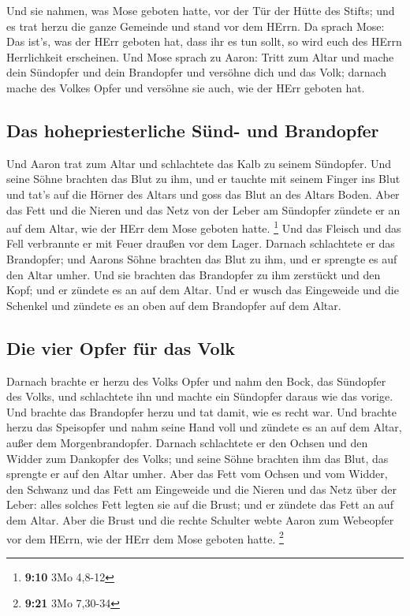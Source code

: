  Und sie nahmen, was Mose geboten hatte, vor der Tür der
Hütte des Stifts; und es trat herzu die ganze Gemeinde und stand vor dem
HErrn.  Da sprach Mose: Das ist's, was der HErr geboten
hat, dass ihr es tun sollt, so wird euch des HErrn Herrlichkeit
erscheinen.  Und Mose sprach zu Aaron: Tritt zum Altar und
mache dein Sündopfer und dein Brandopfer und versöhne dich und das Volk;
darnach mache des Volkes Opfer und versöhne sie auch, wie der HErr
geboten hat.

\hypertarget{das-hohepriesterliche-suxfcnd--und-brandopfer}{%
\subsection{Das hohepriesterliche Sünd- und
Brandopfer}\label{das-hohepriesterliche-suxfcnd--und-brandopfer}}

 Und Aaron trat zum Altar und schlachtete das Kalb zu
seinem Sündopfer.  Und seine Söhne brachten das Blut zu
ihm, und er tauchte mit seinem Finger ins Blut und tat's auf die Hörner
des Altars und goss das Blut an des Altars Boden.  Aber
das Fett und die Nieren und das Netz von der Leber am Sündopfer zündete
er an auf dem Altar, wie der HErr dem Mose geboten hatte. \footnote{\textbf{9:10}
  3Mo 4,8-12}  Und das Fleisch und das Fell verbrannte er
mit Feuer draußen vor dem Lager.  Darnach schlachtete er
das Brandopfer; und Aarons Söhne brachten das Blut zu ihm, und er
sprengte es auf den Altar umher.  Und sie brachten das
Brandopfer zu ihm zerstückt und den Kopf; und er zündete es an auf dem
Altar.  Und er wusch das Eingeweide und die Schenkel und
zündete es an oben auf dem Brandopfer auf dem Altar.

\hypertarget{die-vier-opfer-fuxfcr-das-volk}{%
\subsection{Die vier Opfer für das
Volk}\label{die-vier-opfer-fuxfcr-das-volk}}

 Darnach brachte er herzu des Volks Opfer und nahm den
Bock, das Sündopfer des Volks, und schlachtete ihn und machte ein
Sündopfer daraus wie das vorige.  Und brachte das
Brandopfer herzu und tat damit, wie es recht war.  Und
brachte herzu das Speisopfer und nahm seine Hand voll und zündete es an
auf dem Altar, außer dem Morgenbrandopfer.  Darnach
schlachtete er den Ochsen und den Widder zum Dankopfer des Volks; und
seine Söhne brachten ihm das Blut, das sprengte er auf den Altar umher.
 Aber das Fett vom Ochsen und vom Widder, den Schwanz und
das Fett am Eingeweide und die Nieren und das Netz über der Leber:
 alles solches Fett legten sie auf die Brust; und er
zündete das Fett an auf dem Altar.  Aber die Brust und
die rechte Schulter webte Aaron zum Webeopfer vor dem HErrn, wie der
HErr dem Mose geboten hatte. \footnote{\textbf{9:21} 3Mo 7,30-34}


